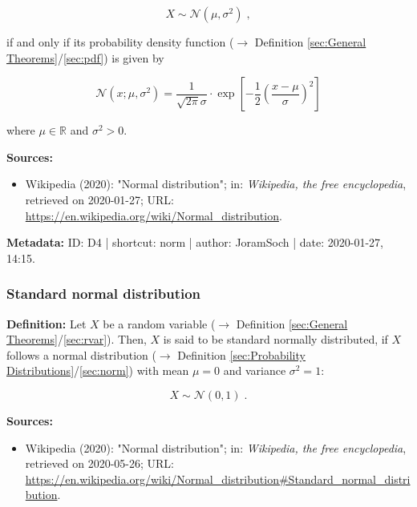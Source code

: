 \documentclass[a4paper,12pt,twoside]{book}
\begin{document}
\begin{equation} \label{eq:norm-norm}
X \sim \mathcal{N}(\mu, \sigma^2) \; ,
\end{equation}

if and only if its probability density function ($\rightarrow$ Definition \ref{sec:General Theorems}/\ref{sec:pdf}) is given by

\begin{equation} \label{eq:norm-norm-pdf}
\mathcal{N}(x; \mu, \sigma^2) = \frac{1}{\sqrt{2 \pi} \sigma} \cdot \exp \left[ -\frac{1}{2} \left( \frac{x-\mu}{\sigma} \right)^2 \right]
\end{equation}

where $\mu \in \mathbb{R}$ and $\sigma^2 > 0$.


\vspace{1em}
\textbf{Sources:}
\begin{itemize}
\item Wikipedia (2020): "Normal distribution"; in: \textit{Wikipedia, the free encyclopedia}, retrieved on 2020-01-27; URL: \url{https://en.wikipedia.org/wiki/Normal_distribution}.
\end{itemize}


\vspace{1em}
\textbf{Metadata:} ID: D4 | shortcut: norm | author: JoramSoch | date: 2020-01-27, 14:15.
\vspace{1em}



\subsubsection[\textit{Standard normal distribution}]{Standard normal distribution} \label{sec:snorm}
\setcounter{equation}{0}

\textbf{Definition:} Let $X$ be a random variable ($\rightarrow$ Definition \ref{sec:General Theorems}/\ref{sec:rvar}). Then, $X$ is said to be standard normally distributed, if $X$ follows a normal distribution ($\rightarrow$ Definition \ref{sec:Probability Distributions}/\ref{sec:norm}) with mean $\mu = 0$ and variance $\sigma^2 = 1$:

\begin{equation} \label{eq:snorm-snorm}
X \sim \mathcal{N}(0, 1) \; .
\end{equation}


\vspace{1em}
\textbf{Sources:}
\begin{itemize}
\item Wikipedia (2020): "Normal distribution"; in: \textit{Wikipedia, the free encyclopedia}, retrieved on 2020-05-26; URL: \url{https://en.wikipedia.org/wiki/Normal_distribution#Standard_normal_distribution}.
\end{itemize}
\end{document}
